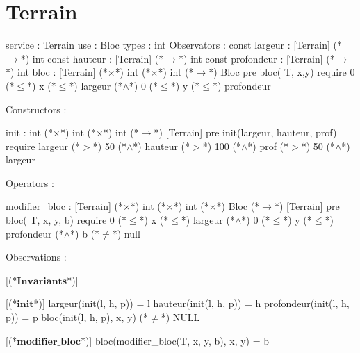 \documentclass[a4paper, 11pt, notitlepage]{report}
\newcommand{\specB}[1]{\textbf{#1}}
\begin{document}
\section{Terrain}
\begin{Spe}
service : Terrain
use : Bloc
types : int
Observators :
	const largeur : [Terrain] (*$\rightarrow$*) int
	const hauteur : [Terrain] (*$\rightarrow$*) int
	const profondeur : [Terrain] (*$\rightarrow$*) int
	bloc : [Terrain] (*$\times$*) int (*$\times$*) int (*$\rightarrow$*) Bloc
		pre bloc( T, x,y) require 0 (*$\leq$*) x (*$\leq$*) largeur (*$\land$*) 0 (*$\leq$*) y (*$\leq$*) profondeur
	     
Constructors :

	init : int (*$\times$*) int (*$\times$*) int (*$\rightarrow$*) [Terrain]
		pre init(largeur, hauteur, prof) require largeur (*$>$*) 50 (*$\land$*) hauteur (*$>$*) 100 (*$\land$*) prof (*$>$*) 50 (*$\land$*) largeur%
	     
Operators : 

	modifier_bloc : [Terrain] (*$\times$*) int (*$\times$*) int (*$\times$*) Bloc (*$\rightarrow$*) [Terrain]
		pre bloc( T, x, y, b) require 0 (*$\leq$*) x (*$\leq$*) largeur (*$\land$*) 0 (*$\leq$*) y (*$\leq$*) profondeur (*$\land$*) b (*$\neq$*) null
	     
Observations :

      [(*$\specB{Invariants}$*)]
      
      [(*$\specB{init}$*)]
	    largeur(init(l, h, p)) = l
	    hauteur(init(l, h, p)) = h
	    profondeur(init(l, h, p)) = p
	    bloc(init(l, h, p), x, y) (*$\neq$*) NULL
	    
      [(*$\specB{modifier\_bloc}$*)]
	    bloc(modifier_bloc(T, x, y, b), x, y) = b 
	    
\end{Spe}
\end{document}
